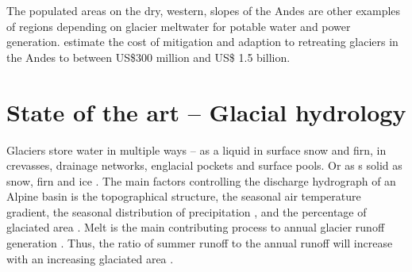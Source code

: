 \documentclass[12pt, a4paper]{article}
\begin{document}
The populated areas on the dry, western, slopes of the Andes are other examples
of regions depending on glacier meltwater for potable water and power
generation. \textcite{vergaraEconomicImpactsRapid2007} estimate the cost of
mitigation and adaption to retreating glaciers in the Andes to between US\$300
million and US\$ 1.5 billion.




\section{State of the art -- Glacial hydrology}
Glaciers store water in multiple ways -- as a liquid in surface snow and firn,
in crevasses, drainage networks, englacial pockets and surface pools. Or as s
solid as snow, firn and ice \parencite{janssonConceptGlacierStorage2003}. The
main factors controlling the discharge hydrograph of an Alpine basin is the
topographical structure, the seasonal air temperature gradient, the seasonal
distribution of precipitation \parencite{zappaSeasonalWaterBalance2003}, and the
percentage of glaciated area \parencite{janssonConceptGlacierStorage2003}. Melt
is the main contributing process to annual glacier runoff generation
\parencite{zappaSeasonalWaterBalance2003}. Thus, the ratio of summer runoff to
the annual runoff will increase with an increasing glaciated area
\parencite{chenInfluenceAlpineGlaciers1990}.
\end{document}
